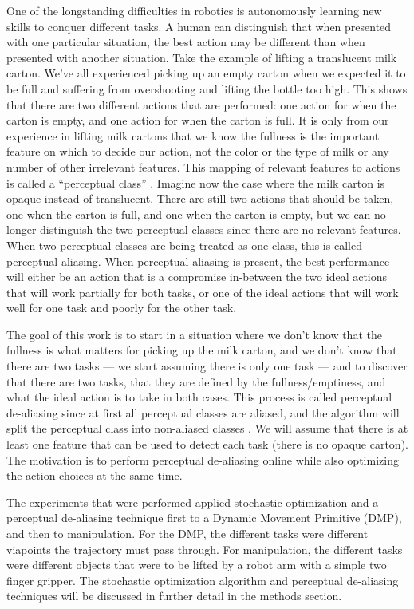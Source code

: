 \documentclass[12pt]{article}
\begin{document}
One of the longstanding difficulties in robotics is autonomously learning new skills to conquer different tasks. A human can distinguish that when presented with one particular situation, the best action may be different than when presented with another situation. Take the example of lifting a translucent milk carton. We've all experienced picking up an empty carton when we expected it to be full and suffering from overshooting and lifting the bottle too high. This shows that there are two different actions that are performed: one action for when the carton is empty, and one action for when the carton is full. It is only from our experience in lifting milk cartons that we know the fullness is the important feature on which to decide our action, not the color or the type of milk or any number of other irrelevant features. This mapping of relevant features to actions is called a ``perceptual class'' \cite{piater11learning}. Imagine now the case where the milk carton is opaque instead of translucent. There are still two actions that should be taken, one when the carton is full, and one when the carton is empty, but we can no longer distinguish the two perceptual classes since there are no relevant features. When two perceptual classes are being treated as one class, this is called perceptual aliasing. When perceptual aliasing is present, the best performance will either be an action that is a compromise in-between the two ideal actions that will work partially for both tasks, or one of the ideal actions that will work well for one task and poorly for the other task. 

The goal of this work is to start in a situation where we don't know that the fullness is what matters for picking up the milk carton, and we don't know that there are two tasks --- we start assuming there is only one task --- and to discover that there are two tasks, that they are defined by the fullness/emptiness, and what the ideal action is to take in both cases. This process is called perceptual de-aliasing since at first all perceptual classes are aliased, and the algorithm will split the perceptual class into non-aliased classes \cite{daniel12learning}. We will assume that there is at least one feature that can be used to detect each task (there is no opaque carton). The motivation is to perform perceptual de-aliasing online while also optimizing the action choices at the same time.

The experiments that were performed applied stochastic optimization and a perceptual de-aliasing technique first to a Dynamic Movement Primitive (DMP), and then to manipulation. For the DMP, the different tasks were different viapoints the trajectory must pass through. For manipulation, the different tasks were different objects that were to be lifted by a robot arm with a simple two finger gripper. The stochastic optimization algorithm and perceptual de-aliasing techniques will be discussed in further detail in the methods section.
\end{document}
